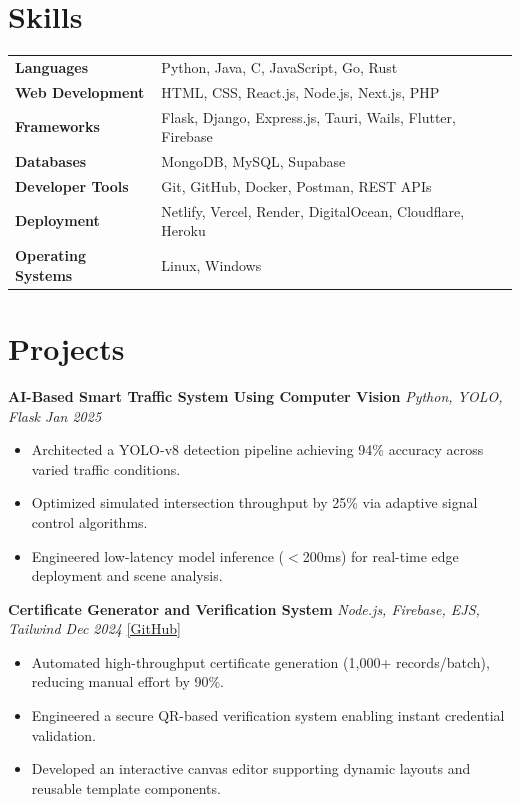 \documentclass[10pt, a4paper]{article}
\begin{document}
\section*{Skills}

\renewcommand{\arraystretch}{1.05}
\begin{tabular}{@{} >{\bfseries}p{3.8cm} p{13cm} @{}}
Languages           & Python, Java, C, JavaScript, Go, Rust \\
Web Development     & HTML, CSS, React.js, Node.js, Next.js, PHP \\
Frameworks          & Flask, Django, Express.js, Tauri, Wails, Flutter, Firebase \\
Databases           & MongoDB, MySQL, Supabase \\
Developer Tools     & Git, GitHub, Docker, Postman, REST APIs \\
Deployment          & Netlify, Vercel, Render, DigitalOcean, Cloudflare, Heroku \\
Operating Systems   & Linux, Windows \\
\end{tabular}

\section*{Projects}

\textbf{AI-Based Smart Traffic System Using Computer Vision} \hfill \textit{Python, YOLO, Flask \quad Jan 2025}
\begin{itemize}
\item Architected a YOLO-v8 detection pipeline achieving 94\% accuracy across varied traffic conditions.
\item Optimized simulated intersection throughput by 25\% via adaptive signal control algorithms.
\item Engineered low-latency model inference ($<$200ms) for real-time edge deployment and scene analysis.
\end{itemize}

\vspace{3pt}

\textbf{Certificate Generator and Verification System} \hfill \textit{Node.js, Firebase, EJS, Tailwind \quad Dec 2024} \quad \href{https://github.com/your-github/advanced-certificate-generator}{[GitHub]}
\begin{itemize}
\item Automated high-throughput certificate generation (1,000+ records/batch), reducing manual effort by 90\%.
\item Engineered a secure QR-based verification system enabling instant credential validation.
\item Developed an interactive canvas editor supporting dynamic layouts and reusable template components.
\end{itemize}
\end{document}
